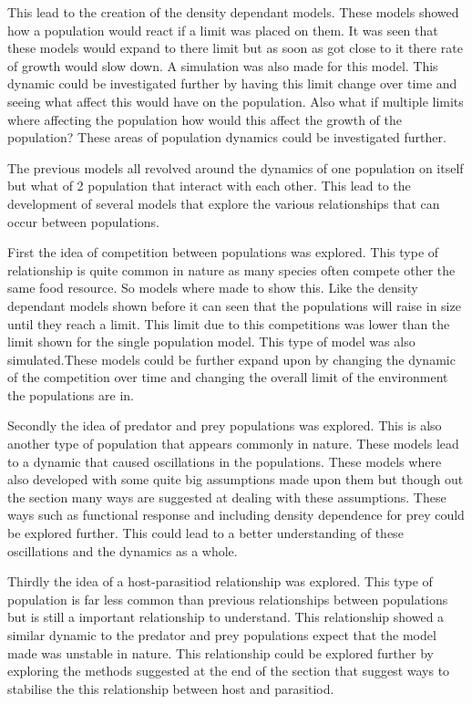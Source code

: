 \documentclass[final]{cmpreport}
\begin{document}
	
	This lead to the creation of the density dependant models. These models showed how a population would react if a limit was placed on them. It was seen that these models would expand to there limit but as soon as got close to it there rate of growth would slow down. A simulation was also made for this model. This dynamic could be investigated further by having this limit change over time and seeing what affect this would have on the population. Also what if multiple limits where affecting the population how would this affect the growth of the population? These areas of population dynamics could be investigated further. 
	
	The previous models all revolved around the dynamics of one population on itself but what of 2 population that interact with each other. This lead to the development of several models that explore the various relationships that can occur between populations.
	
	First the idea of competition between populations was explored. This type of relationship is quite common in nature as many species often compete other the same food resource. So models where made to show this. Like the density dependant models shown before it can seen that the populations will raise in size until they reach a limit. This limit due to this competitions was lower than the limit shown for the single population model. This type of model was also simulated.These models could be further expand upon by changing the dynamic of the competition over time and changing the overall limit of the environment the populations are in.
	
	Secondly the idea of predator and prey populations was explored. This is also another type of population that appears commonly in nature. These models lead to a dynamic that caused oscillations in the populations.  These models where also developed with some quite big assumptions made upon them but though out the section many ways are suggested at dealing with these assumptions. These ways such as functional response and  including density dependence for prey could be explored further. This could lead to a better understanding of these oscillations and the dynamics as a whole.
	
	Thirdly the idea of a host-parasitiod relationship was explored. This type of population is far less common than previous relationships between populations but is still a important relationship to understand. This relationship showed a similar dynamic to the predator and prey populations expect that the model made was unstable in nature. This relationship could be explored further by exploring the methods suggested at the end of the section that suggest ways to stabilise the this relationship between host and parasitiod.
	
\end{document}
